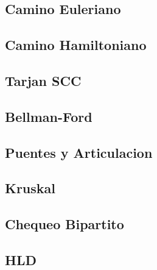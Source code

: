 \documentclass[a4paper,11pt,landscape,twocolumn]{article}
\begin{document}


\subsection{Camino Euleriano}



\subsection{Camino Hamiltoniano}



\subsection{Tarjan SCC}



\subsection{Bellman-Ford}



\subsection{Puentes y Articulacion}



\subsection{Kruskal}



\subsection{Chequeo Bipartito}



\subsection{HLD}


\end{document}
